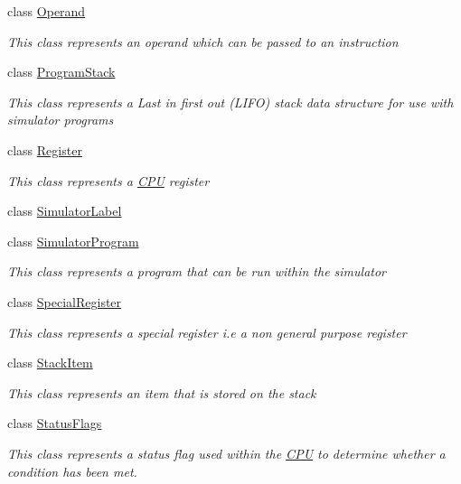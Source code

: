 \begin{DoxyCompactItemize}
class \hyperlink{class_c_p_u___o_s___simulator_1_1_c_p_u_1_1_operand}{Operand}
\begin{DoxyCompactList}\small\item\em This class represents an operand which can be passed to an instruction \end{DoxyCompactList}\item 
class \hyperlink{class_c_p_u___o_s___simulator_1_1_c_p_u_1_1_program_stack}{Program\+Stack}
\begin{DoxyCompactList}\small\item\em This class represents a Last in first out (L\+I\+F\+O) stack data structure for use with simulator programs \end{DoxyCompactList}\item 
class \hyperlink{class_c_p_u___o_s___simulator_1_1_c_p_u_1_1_register}{Register}
\begin{DoxyCompactList}\small\item\em This class represents a \hyperlink{namespace_c_p_u___o_s___simulator_1_1_c_p_u}{C\+P\+U} register \end{DoxyCompactList}\item 
class \hyperlink{class_c_p_u___o_s___simulator_1_1_c_p_u_1_1_simulator_label}{Simulator\+Label}
\item 
class \hyperlink{class_c_p_u___o_s___simulator_1_1_c_p_u_1_1_simulator_program}{Simulator\+Program}
\begin{DoxyCompactList}\small\item\em This class represents a program that can be run within the simulator \end{DoxyCompactList}\item 
class \hyperlink{class_c_p_u___o_s___simulator_1_1_c_p_u_1_1_special_register}{Special\+Register}
\begin{DoxyCompactList}\small\item\em This class represents a special register i.\+e a non general purpose register \end{DoxyCompactList}\item 
class \hyperlink{class_c_p_u___o_s___simulator_1_1_c_p_u_1_1_stack_item}{Stack\+Item}
\begin{DoxyCompactList}\small\item\em This class represents an item that is stored on the stack \end{DoxyCompactList}\item 
class \hyperlink{class_c_p_u___o_s___simulator_1_1_c_p_u_1_1_status_flags}{Status\+Flags}
\begin{DoxyCompactList}\small\item\em This class represents a status flag used within the \hyperlink{namespace_c_p_u___o_s___simulator_1_1_c_p_u}{C\+P\+U} to determine whether a condition has been met. \end{DoxyCompactList}\end{DoxyCompactItemize}
